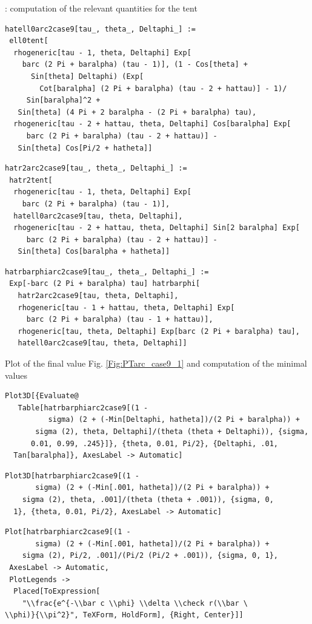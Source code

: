 \documentclass[reqno]{amsart}
\theoremstyle{definition} \newtheorem{definition}{Definition}[section]
\theoremstyle{definition} \newtheorem{remark}[definition]{Remark}
\theoremstyle{plain} \newtheorem{lemma}[definition]{Lemma}
\theoremstyle{plain} \newtheorem{proposition}[definition]{Proposition}
\theoremstyle{plain} \newtheorem{theorem}[definition]{Theorem}
\theoremstyle{plain} \newtheorem{corollary}[definition]{Corollary}
\theoremstyle{definition} \newtheorem{example}[definition]{Example}
\theoremstyle{plain} \newtheorem{claim}[clai]{Claim}
\theoremstyle{definition} \newtheorem{assumption}[definition]{Assumption}
\theoremstyle{definition} \newtheorem{observation}[definition]{Observation}
\newcommand{\1}{\mathbbm 1}
\newcommand{\smed}{\medskip}
\newcommand{\sbig}{\bigskip}
\numberwithin{equation}{section} %
\theoremstyle{plain} \newtheorem*{theorem*}{Theorem}
\theoremstyle{plain} \newtheorem{mthm}[maintheorem]{Main Theorem}
\theoremstyle{plain} \newtheorem*{mthm*}{Main Theorem}
\theoremstyle{plain} \newtheorem*{conjecture*}{Conjecture}
\theoremstyle{plain} \newtheorem{conjecture}[definition]{Conjecture}
\theoremstyle{plain} \newtheorem*{problem*}{Problem}
\begin{document}
\sbig

: computation of the relevant quantities for the tent
\smed
\begin{verbatim}
hatell0arc2case9[tau_, theta_, Deltaphi_] := 
 ell0tent[
  rhogeneric[tau - 1, theta, Deltaphi] Exp[
    barc (2 Pi + baralpha) (tau - 1)], (1 - Cos[theta] + 
      Sin[theta] Deltaphi) (Exp[
        Cot[baralpha] (2 Pi + baralpha) (tau - 2 + hattau)] - 1)/
     Sin[baralpha]^2 + 
   Sin[theta] (4 Pi + 2 baralpha - (2 Pi + baralpha) tau), 
  rhogeneric[tau - 2 + hattau, theta, Deltaphi] Cos[baralpha] Exp[
     barc (2 Pi + baralpha) (tau - 2 + hattau)] - 
   Sin[theta] Cos[Pi/2 + hatheta]]
\end{verbatim}
\begin{verbatim}
hatr2arc2case9[tau_, theta_, Deltaphi_] := 
 hatr2tent[
  rhogeneric[tau - 1, theta, Deltaphi] Exp[
    barc (2 Pi + baralpha) (tau - 1)], 
  hatell0arc2case9[tau, theta, Deltaphi], 
  rhogeneric[tau - 2 + hattau, theta, Deltaphi] Sin[2 baralpha] Exp[
     barc (2 Pi + baralpha) (tau - 2 + hattau)] - 
   Sin[theta] Cos[baralpha + hatheta]]
\end{verbatim}
\begin{verbatim}
hatrbarphiarc2case9[tau_, theta_, Deltaphi_] := 
 Exp[-barc (2 Pi + baralpha) tau] hatrbarphi[
   hatr2arc2case9[tau, theta, Deltaphi], 
   rhogeneric[tau - 1 + hattau, theta, Deltaphi] Exp[
     barc (2 Pi + baralpha) (tau - 1 + hattau)], 
   rhogeneric[tau, theta, Deltaphi] Exp[barc (2 Pi + baralpha) tau], 
   hatell0arc2case9[tau, theta, Deltaphi]]
\end{verbatim}
\smed
Plot of the final value Fig. \ref{Fig:PTarc_case9_1} and computation of the minimal values
\smed
\begin{verbatim}
Plot3D[{Evaluate@
   Table[hatrbarphiarc2case9[(1 - 
          sigma) (2 + (-Min[Deltaphi, hatheta])/(2 Pi + baralpha)) + 
       sigma (2), theta, Deltaphi]/(theta (theta + Deltaphi)), {sigma,
      0.01, 0.99, .245}]}, {theta, 0.01, Pi/2}, {Deltaphi, .01, 
  Tan[baralpha]}, AxesLabel -> Automatic]
\end{verbatim}
\begin{verbatim}
Plot3D[hatrbarphiarc2case9[(1 - 
       sigma) (2 + (-Min[.001, hatheta])/(2 Pi + baralpha)) + 
    sigma (2), theta, .001]/(theta (theta + .001)), {sigma, 0, 
  1}, {theta, 0.01, Pi/2}, AxesLabel -> Automatic]
\end{verbatim}
\begin{verbatim}
Plot[hatrbarphiarc2case9[(1 - 
       sigma) (2 + (-Min[.001, hatheta])/(2 Pi + baralpha)) + 
    sigma (2), Pi/2, .001]/(Pi/2 (Pi/2 + .001)), {sigma, 0, 1}, 
 AxesLabel -> Automatic, 
 PlotLegends -> 
  Placed[ToExpression[
    "\\frac{e^{-\\bar c \\phi} \\delta \\check r(\\bar \
\\phi)}{\\pi^2}", TeXForm, HoldForm], {Right, Center}]]
\end{verbatim}
\end{document}
